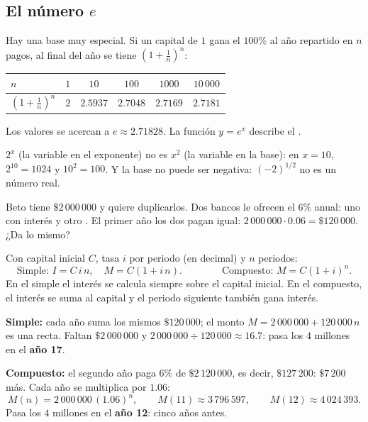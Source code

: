 \documentclass[11pt,a4paper]{article}
\begin{document}
\subsection{El número $e$}
Hay una base muy especial. Si un capital de $1$ gana el $100\%$ al año repartido en $n$ pagos, al final del año se
tiene $\left(1+\tfrac1n\right)^{n}$:
\begin{center}
\begin{tabular}{@{}lccccc@{}}
\toprule
$n$ & $1$ & $10$ & $100$ & $1000$ & $10\,000$\\ \midrule
$\left(1+\tfrac1n\right)^{n}$ & $2$ & $2.5937$ & $2.7048$ & $2.7169$ & $2.7181$\\
\bottomrule
\end{tabular}
\end{center}
Los valores se acercan a $e\approx2.71828$. La función $y=e^{x}$ describe el .

\begin{ojo}[No confundas]
$2^{x}$ (la variable en el exponente) no es $x^{2}$ (la variable en la base): en $x=10$, $2^{10}=1024$ y $10^2=100$.
Y la base no puede ser negativa: $(-2)^{1/2}$ no es un número real.
\end{ojo}


Beto tiene $\$2\,000\,000$ y quiere duplicarlos. Dos bancos le ofrecen el $6\%$ anual: uno con interés
 y otro . El primer año los dos pagan igual: $2\,000\,000\cdot0.06=\$120\,000$.
¿Da lo mismo?

\begin{definicion}
Con capital inicial $C$, tasa $i$ por periodo (en decimal) y $n$ periodos:
\[
\text{Simple: } I=C\,i\,n,\quad M=C(1+i\,n).
\qquad\qquad
\text{Compuesto: } M=C(1+i)^{n}.
\]
En el simple el interés se calcula siempre sobre el capital inicial. En el compuesto, el interés se suma al capital y
el periodo siguiente también gana interés.
\end{definicion}

\begin{ejemplo}
\textbf{Simple:} cada año suma los mismos $\$120\,000$; el monto $M=2\,000\,000+120\,000\,n$ es una recta. Faltan
$\$2\,000\,000$ y $2\,000\,000\div120\,000\approx16.7$: pasa los $4$ millones en el \textbf{año 17}.\par
\textbf{Compuesto:} el segundo año paga $6\%$ de $\$2\,120\,000$, es decir, $\$127\,200$: $\$7\,200$ más. Cada año se
multiplica por $1.06$:
\[ M(n)=2\,000\,000\,(1.06)^{n},\qquad M(11)\approx3\,796\,597,\qquad M(12)\approx4\,024\,393 . \]
Pasa los $4$ millones en el \textbf{año 12}: cinco años antes.
\end{ejemplo}
\end{document}
